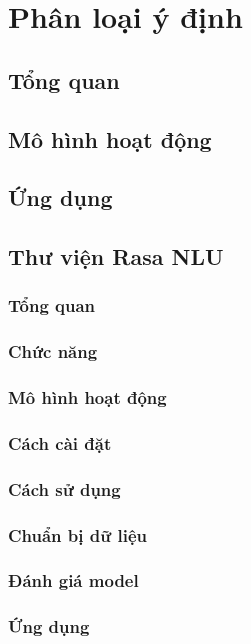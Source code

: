 \chapter{Phân loại ý định}
\ifpdf
    \graphicspath{{Chapter5/Chapter5Figs/PNG/}{Chapter5/Chapter5Figs/PDF/}{Chapter5/Chapter5Figs/}}
\else
    \graphicspath{{Chapter5/Chapter5Figs/EPS/}{Chapter5/Chapter5Figs/}}
\fi

\section{Tổng quan}
\section{Mô hình hoạt động}
\section{Ứng dụng}
\section{Thư viện Rasa NLU}
\subsection{Tổng quan}
\subsection{Chức năng}
\subsection{Mô hình hoạt động}
\subsection{Cách cài đặt}
\subsection{Cách sử dụng}
\subsection{Chuẩn bị dữ liệu}
\subsection{Đánh giá model}
\subsection{Ứng dụng}
